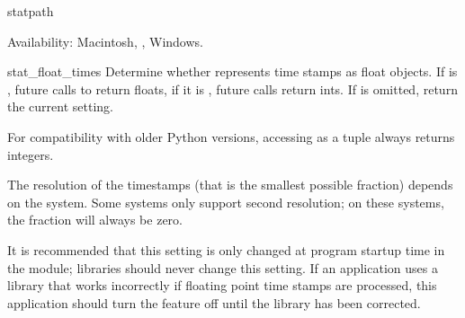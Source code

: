 \begin{funcdesc}{stat}{path}

Availability: Macintosh, \UNIX, Windows.

\end{funcdesc}

\begin{funcdesc}{stat_float_times}{}
Determine whether  represents time stamps as float
objects.  If  is , future calls to 
return floats, if it is , future calls return ints.
If  is omitted, return the current setting.

For compatibility with older Python versions, accessing
 as a tuple always returns integers.


The resolution of the timestamps (that is the smallest possible fraction)
depends on the system. Some systems only support second resolution;
on these systems, the fraction will always be zero.

It is recommended that this setting is only changed at program startup
time in the  module; libraries should never change this
setting. If an application uses a library that works incorrectly if
floating point time stamps are processed, this application should turn
the feature off until the library has been corrected.

\end{funcdesc}

